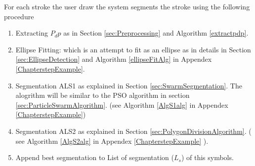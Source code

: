 For each stroke the user draw the system segments the stroke using the following procedure

\begin{enumerate}
\item Extracting $P_dp$ as in Section \ref{sec:Preprocessing} and Algorithm \ref{extractpdp}.
\item Ellipse Fitting: which is an attempt to fit as an ellipse as in details in Section \ref{sec:EllipseDetection} and Algorithm \ref{ellipseFitAlg} in Appendex \ref{ChapterstepExample}.
\item Segmentation ALS1 as explained in Section \ref{sec:SwarmSegmentation}. The alogrithm will be similar to the PSO algorithm  in section \ref{sec:ParticleSwarmAlgorithm}. (see Algorithm \ref{AlgS1alg} in Appendex \ref{ChapterstepExample})
\item Segmentation ALS2 as explained in Section \ref{sec:PolygonDivisionAlgorithm}. ( see Algorithm \ref{AlgS2alg} in Appendex \ref{ChapterstepExample} ). 
\item Append best segmentation to List of segmentation ($L_s$) of this symbols. 
\end{enumerate}


